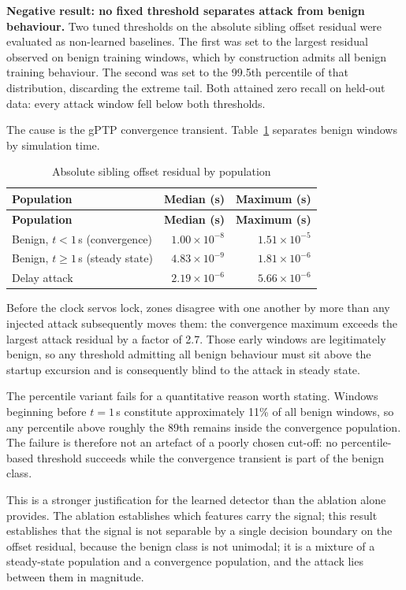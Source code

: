 \textbf{Negative result: no fixed threshold separates attack from benign behaviour.}
Two tuned thresholds on the absolute sibling offset residual were evaluated as
non-learned baselines. The first was set to the largest residual observed on benign
training windows, which by construction admits all benign training behaviour. The
second was set to the 99.5th percentile of that distribution, discarding the extreme
tail. Both attained zero recall on held-out data: every attack window fell below both
thresholds.

The cause is the gPTP convergence transient. Table~\ref{tab:populations} separates
benign windows by simulation time.

\begin{longtable}{p{} r r}
\caption{Absolute sibling offset residual by population}\label{tab:populations}\\
\toprule
\textbf{Population} & \textbf{Median (s)} & \textbf{Maximum (s)} \\
\midrule
\endfirsthead
\toprule
\textbf{Population} & \textbf{Median (s)} & \textbf{Maximum (s)} \\
\midrule
\endhead
Benign, $t < 1$\,s (convergence) & $1.00\times10^{-8}$ & $1.51\times10^{-5}$ \\
Benign, $t \geq 1$\,s (steady state) & $4.83\times10^{-9}$ & $1.81\times10^{-6}$ \\
Delay attack & $2.19\times10^{-6}$ & $5.66\times10^{-6}$ \\
\bottomrule
\end{longtable}

Before the clock servos lock, zones disagree with one another by more than any injected
attack subsequently moves them: the convergence maximum exceeds the largest attack
residual by a factor of 2.7. Those early windows are legitimately benign, so any
threshold admitting all benign behaviour must sit above the startup excursion and is
consequently blind to the attack in steady state.

The percentile variant fails for a quantitative reason worth stating. Windows beginning
before $t = 1$\,s constitute approximately 11\% of all benign windows, so any percentile
above roughly the 89th remains inside the convergence population. The failure is
therefore not an artefact of a poorly chosen cut-off: no percentile-based threshold
succeeds while the convergence transient is part of the benign class.

This is a stronger justification for the learned detector than the ablation alone
provides. The ablation establishes which features carry the signal; this result
establishes that the signal is not separable by a single decision boundary on the
offset residual, because the benign class is not unimodal; it is a mixture of a
steady-state population and a convergence population, and the attack lies between them
in magnitude.

